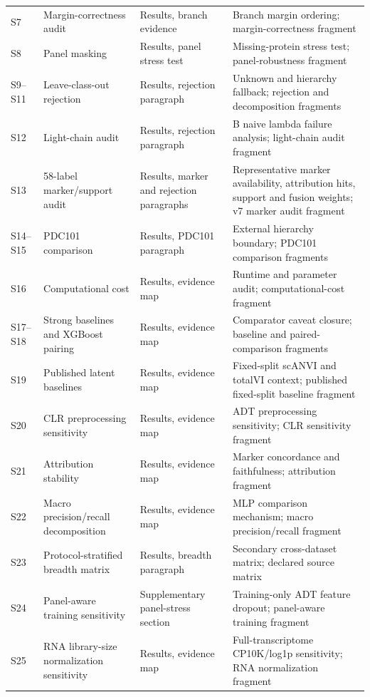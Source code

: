 \documentclass[10pt]{article}
\begin{document}
\begin{center}
\begin{tabularx}{\textwidth}{lllX}
S7 & Margin-correctness audit & Results, branch evidence & Branch margin ordering; margin-correctness fragment \\
S8 & Panel masking & Results, panel stress test & Missing-protein stress test; panel-robustness fragment \\
S9--S11 & Leave-class-out rejection & Results, rejection paragraph & Unknown and hierarchy fallback; rejection and decomposition fragments \\
S12 & Light-chain audit & Results, rejection paragraph & B naive lambda failure analysis; light-chain audit fragment \\
S13 & 58-label marker/support audit & Results, marker and rejection paragraphs & Representative marker availability, attribution hits, support and fusion weights; v7 marker audit fragment \\
S14--S15 & PDC101 comparison & Results, PDC101 paragraph & External hierarchy boundary; PDC101 comparison fragments \\
S16 & Computational cost & Results, evidence map & Runtime and parameter audit; computational-cost fragment \\
S17--S18 & Strong baselines and XGBoost pairing & Results, evidence map & Comparator caveat closure; baseline and paired-comparison fragments \\
S19 & Published latent baselines & Results, evidence map & Fixed-split scANVI and totalVI context; published fixed-split baseline fragment \\
S20 & CLR preprocessing sensitivity & Results, evidence map & ADT preprocessing sensitivity; CLR sensitivity fragment \\
S21 & Attribution stability & Results, evidence map & Marker concordance and faithfulness; attribution fragment \\
S22 & Macro precision/recall decomposition & Results, evidence map & MLP comparison mechanism; macro precision/recall fragment \\
S23 & Protocol-stratified breadth matrix & Results, breadth paragraph & Secondary cross-dataset matrix; declared source matrix \\
S24 & Panel-aware training sensitivity & Supplementary panel-stress section & Training-only ADT feature dropout; panel-aware training fragment \\
S25 & RNA library-size normalization sensitivity & Results, evidence map & Full-transcriptome CP10K/log1p sensitivity; RNA normalization fragment \\
\bottomrule
\end{tabularx}
\end{center}
\end{document}
